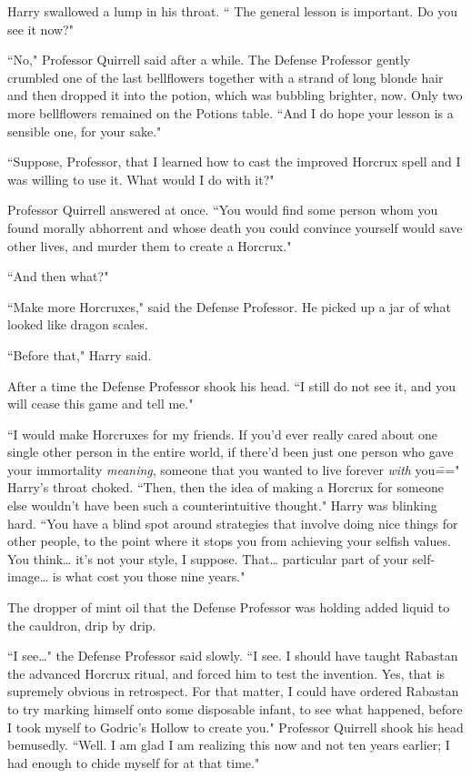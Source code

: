 Harry swallowed a lump in his throat. `` The general lesson is important. Do you see it now?"

``No," Professor Quirrell said after a while. The Defense Professor gently crumbled one of the last bellflowers together with a strand of long blonde hair and then dropped it into the potion, which was bubbling brighter, now. Only two more bellflowers remained on the Potions table. ``And I do hope your lesson is a sensible one, for your sake."

``Suppose, Professor, that I learned how to cast the improved Horcrux spell and I was willing to use it. What would I do with it?"

Professor Quirrell answered at once. ``You would find some person whom you found morally abhorrent and whose death you could convince yourself would save other lives, and murder them to create a Horcrux."

``And then what?"

``Make more Horcruxes," said the Defense Professor. He picked up a jar of what looked like dragon scales.

``Before that," Harry said.

After a time the Defense Professor shook his head. ``I still do not see it, and you will cease this game and tell me."

``I would make Horcruxes for my friends. If you'd ever really cared about one single other person in the entire world, if there'd been just one person who gave your immortality \emph{meaning}, someone that you wanted to live forever \emph{with} you\===" Harry's throat choked. ``Then, then the idea of making a Horcrux for someone else wouldn't have been such a counterintuitive thought." Harry was blinking hard. ``You have a blind spot around strategies that involve doing nice things for other people, to the point where it stops you from achieving your selfish values. You think{\ldots} it's not your style, I suppose. That{\ldots} particular part of your self-image{\ldots} is what cost you those nine years."

The dropper of mint oil that the Defense Professor was holding added liquid to the cauldron, drip by drip.

``I see{\ldots}" the Defense Professor said slowly. ``I see. I should have taught Rabastan the advanced Horcrux ritual, and forced him to test the invention. Yes, that is supremely obvious in retrospect. For that matter, I could have ordered Rabastan to try marking himself onto some disposable infant, to see what happened, before I took myself to Godric's Hollow to create you." Professor Quirrell shook his head bemusedly. ``Well. I am glad I am realizing this now and not ten years earlier; I had enough to chide myself for at that time."

